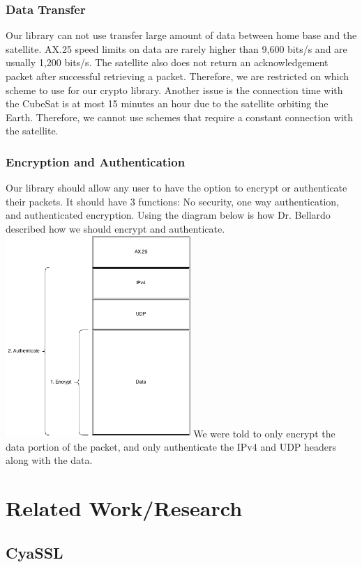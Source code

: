 \documentclass[12pt]{article}
\begin{document}
\begin{multicols}{2}
\subsubsection{Data Transfer}
Our library can not use transfer large amount of data between home base and the satellite. AX.25 speed limits on data are rarely higher than 9,600 bits/s and are usually 1,200 bits/s. The satellite also does not return an acknowledgement packet after successful retrieving a packet. Therefore, we are restricted on which scheme to use for our crypto library. Another issue is the connection time with the CubeSat is at most 15 minutes an hour due to the satellite orbiting the Earth. Therefore, we cannot use schemes that require a constant connection with the satellite. 
\subsubsection{Encryption and Authentication}
Our library should allow any user to have the option to encrypt or authenticate their packets. It should have 3 functions: No security, one way authentication, and authenticated encryption. Using the diagram below is how Dr. Bellardo described how we should encrypt and authenticate. \\
\begingroup
    \centering
    \includegraphics[width=7cm]{researchDiagram.png}
\endgroup
We were told to only encrypt the data portion of the packet, and only authenticate the IPv4 and UDP headers along with the data.
\section{Related Work/Research}
\subsection{CyaSSL}

\end{multicols}
\end{document}
